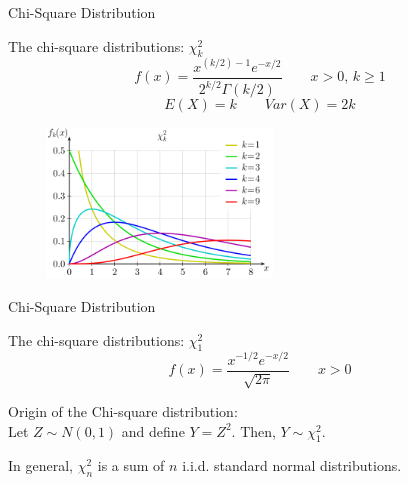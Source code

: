 \documentclass{beamer}\usepackage[]{graphicx}\usepackage[]{color}
\begin{document}
\begin{frame}{Chi-Square Distribution}

The chi-square distributions: $\chi_k^2$
$$f(x) = \frac{ x^{(k/2)-1} e^{- x/2}}{2^{k/2}\Gamma(k/2)}
  \qquad x>0,\, k\geq 1$$ \pause
$$E(X) = k \qquad Var(X) = 2k$$ \pause

\begin{center}
\includegraphics[width=8cm,height=4cm]{chi-square.png}
\end{center}


\end{frame}


\begin{frame}{Chi-Square Distribution}

The chi-square distributions: $\chi_1^2$
$$f(x) = \frac{ x^{-1/2} e^{- x/2}}{\sqrt{2\pi}}
  \qquad x>0$$ \pause
  
Origin of the Chi-square distribution: \\
Let $Z\sim N(0,1)$ and define $Y=Z^2.$  Then, $Y\sim \chi^2_1.$ \pause
\bigskip



\bigskip
In general, $\chi_n^2$ is a sum of $n$ i.i.d. standard normal distributions.

  \end{frame}
\end{document}
